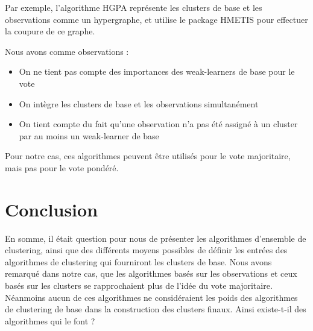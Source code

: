\documentclass[12pt, french, latin.medieval, a4paper]{report}
\begin{document}
    Par exemple, l'algorithme HGPA \cite{strehl2002cluster} représente les clusters de base et les observations comme un hypergraphe,
    et utilise le package HMETIS \cite{karypis1998hypergraph} pour effectuer la coupure de ce graphe.
    
    Nous avons comme observations :
    \begin{itemize}
        \item On ne tient pas compte des importances des weak-learners de base pour le vote
        \item On intègre les clusters de base et les observations simultanément
        \item On tient compte du fait qu'une observation n'a pas été assigné à un cluster par au moins un weak-learner de base
    \end{itemize}

    Pour notre cas, ces algorithmes peuvent être utilisés pour le vote majoritaire, mais pas pour le vote pondéré.

    \section{Conclusion}
    En somme, il était question pour nous de présenter les algorithmes d'ensemble de clustering, 
    ainsi que des différents moyens possibles de définir les entrées des algorithmes de clustering qui fourniront les clusters de base.
    Nous avons remarqué dans notre cas, que les algorithmes basés sur les observations et ceux basés sur les clusters se rapprochaient plus de l'idée 
    du vote majoritaire. 
    Néanmoins aucun de ces algorithmes ne considéraient les poids des algorithmes de clustering de base dans la construction des clusters finaux.
    Ainsi existe-t-il des algorithmes qui le font ?



    
\end{document}
